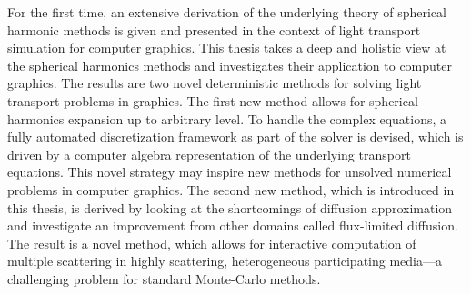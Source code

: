 For the first time, an extensive derivation of the underlying theory of spherical harmonic methods is given and presented in the context of light transport simulation for computer graphics. This thesis takes a deep and holistic view at the spherical harmonics methods and investigates their application to computer graphics. The results are two novel deterministic methods for solving light transport problems in graphics. The first new method allows for spherical harmonics expansion up to arbitrary level. To handle the complex equations, a fully automated discretization framework as part of the solver is devised, which is driven by a computer algebra representation of the underlying transport equations. This novel strategy may inspire new methods for unsolved numerical problems in computer graphics. The second new method, which is introduced in this thesis, is derived by looking at the shortcomings of diffusion approximation and investigate an improvement from other domains called flux-limited diffusion. The result is a novel method, which allows for interactive computation of multiple scattering in highly scattering, heterogeneous participating media---a challenging problem for standard Monte-Carlo methods.